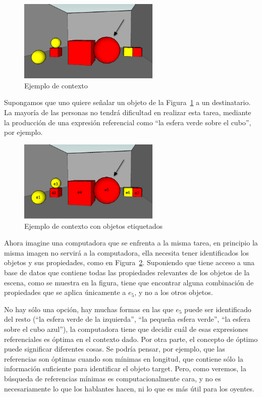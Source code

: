 \begin{figure}[ht]
\centering
\includegraphics[width=0.6\textwidth]{images/22sinletras.jpg}
\caption{Ejemplo de contexto}
\label{GRE3D7-stimulus1}
\end{figure}


Supongamos que uno quiere se\~nalar un objeto de la Figura~\ref{GRE3D7-stimulus1} a un destinatario. La mayor\'{i}a de las personas
no tendr\'a dificultad en realizar esta tarea, mediante la producci\'on de una expresi\'on referencial como ``la
esfera verde sobre el cubo'', por ejemplo. \\

\begin{figure}[ht]
\centering
\includegraphics[width=0.6\textwidth]{images/22.jpg}
\caption{Ejemplo de contexto con objetos etiquetados}
\label{GRE3D7-stimulus2}
\end{figure}

Ahora imagine una computadora que se enfrenta a la misma
tarea, en principio la misma imagen no servir\'a a la computadora, ella necesita tener identificados los objetos y sus propiedades, como en Figura~\ref{GRE3D7-stimulus2}. Suponiendo que tiene acceso a una base de datos que contiene todas
las propiedades relevantes de los objetos de la escena, como se muestra en la figura, tiene que encontrar alguna
combinaci\'on de propiedades que se aplica \'unicamente a $e_5$, y no a los otros objetos. 

No hay s\'olo una opci\'on, hay muchas formas en las que $e_5$ puede ser identificado del resto (``la esfera verde de la izquierda'', ``la peque\~na esfera verde'', ``la esfera sobre el cubo azul''), la computadora tiene que decidir cu\'al de esas expresiones referenciales es \'optima en el contexto dado. Por otra parte, el concepto de \'optimo puede significar diferentes cosas.
Se podr\'{i}a pensar, por ejemplo, que las referencias son \'optimas cuando son m\'{i}nimas en longitud,
que contiene s\'olo la informaci\'on suficiente para identificar el objeto target. Pero, como veremos, la b\'usqueda de referencias m\'{i}nimas
es computacionalmente cara, y no es necesariamente lo que los hablantes hacen, ni lo que es m\'as \'util para los oyentes.\\


